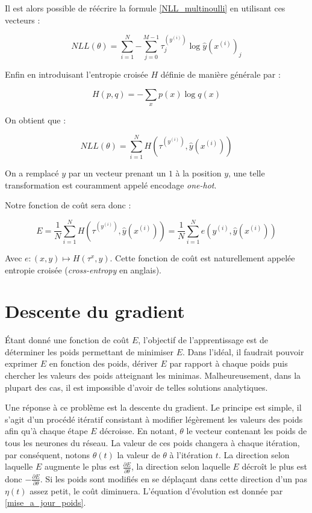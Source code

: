 Il est alors possible de réécrire la formule \ref{NLL_multinoulli} en utilisant ces vecteurs :

\begin{equation}
NLL(\theta) = \sum_{i=1}^{N}{-\sum_{j=0}^{M-1}{\tau^{(y^{(i)})}_j\log \hat{y}(x^{(i)})_j}}
\end{equation}

Enfin en introduisant l'entropie croisée $H$ définie de manière générale par :

$$
H(p, q) = -\sum_{x}{p(x)\log q(x)}
$$

On obtient que :

\begin{equation}
NLL(\theta) = \sum_{i=1}^{N}{H(\tau^{(y^{(i)})}, \hat{y}(x^{(i)}))}
\end{equation}

On a remplacé $y$ par un vecteur prenant un $1$ à la position $y$, une telle transformation est couramment appelé encodage \textit{one-hot}. 

Notre fonction de coût sera donc :

\begin{equation}
E = \frac{1}{N}\sum_{i=1}^{N}{H(\tau^{(y^{(i)})}, \hat{y}(x^{(i)}))} = \frac{1}{N}\sum_{i=1}^{N}{e(y^{(i)}, \hat{y}(x^{(i)}))}
\end{equation}

Avec $e : (x, y) \mapsto H(\tau^x, y)$. Cette fonction de coût est naturellement appelée entropie croisée (\textit{cross-entropy} en anglais).

\section{Descente du gradient}

Étant donné une fonction de coût $E$, l'objectif de l'apprentissage est de déterminer les poids permettant de minimiser $E$. Dans l'idéal, il faudrait pouvoir exprimer $E$ en fonction des poids, dériver $E$ par rapport à chaque poids puis chercher les valeurs des poids atteignant les minimas. Malheureusement, dans la plupart des cas, il est impossible d'avoir de telles solutions analytiques.

Une réponse à ce problème est la descente du gradient. Le principe est simple, il s'agit d'un procédé itératif consistant à modifier légèrement les valeurs des poids afin qu'à chaque étape $E$ décroisse.  En notant, $\theta$ le vecteur contenant les poids de tous les neurones du réseau. La valeur de ces poids changera à chaque itération, par conséquent, notons $\theta(t)$ la valeur de $\theta$ à l'itération $t$. La direction selon laquelle $E$ augmente le plus est $\frac{\partial E}{\partial \theta}$, la direction selon laquelle $E$ décroît le plus est donc $-\frac{\partial E}{\partial \theta}$. Si les poids sont modifiés en se déplaçant dans cette direction d'un pas $\eta(t)$ assez petit, le coût diminuera. L'équation d'évolution est donnée par \ref{mise_a_jour_poids}.

